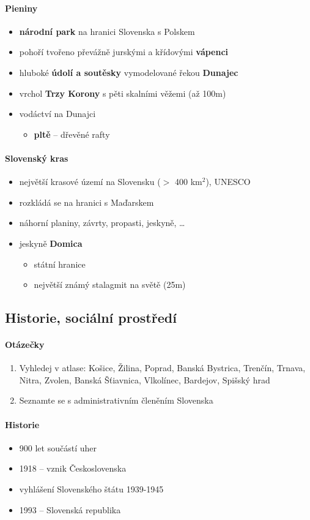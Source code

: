 \paragraph{Pieniny}
\begin{itemize}
\item \textbf{národní park} na hranici Slovenska s Polskem
\item pohoří tvořeno převážně jurskými a křídovými \textbf{vápenci}
\item hluboké \textbf{údolí a soutěsky} vymodelované řekou \textbf{Dunajec}
\item vrchol \textbf{Trzy Korony} s pěti skalními věžemi (až 100m)
\item vodáctví na Dunajci
\begin{itemize}
\item \textbf{pltě} -- dřevěné rafty
\end{itemize}
\end{itemize}

\paragraph{Slovenský kras}
\begin{itemize}
\item největší krasové území na Slovensku ($>$ 400 km$^2$), UNESCO
\item rozkládá se na hranici s Maďarskem
\item náhorní planiny, závrty, propasti, jeskyně, \ldots
\item jeskyně \textbf{Domica}
\begin{itemize}
\item státní hranice
\item největší známý stalagmit na světě (25m)
\end{itemize}
\end{itemize}


\subsection{Historie, sociální prostředí}
\paragraph{Otázečky}
\begin{enumerate}
\item Vyhledej v atlase: Košice, Žilina, Poprad, Banská Bystrica, Trenčín, Trnava, Nitra, Zvolen, Banská Šťiavnica, Vlkolínec, Bardejov, Spišský hrad
\item Seznamte se s administrativním členěním Slovenska
\end{enumerate}

\paragraph{Historie}
\begin{itemize}
\item 900 let součástí uher
\item 1918 -- vznik Československa
\item vyhlášení Slovenského štátu 1939-1945
\item 1993 -- Slovenská republika
\end{itemize}



